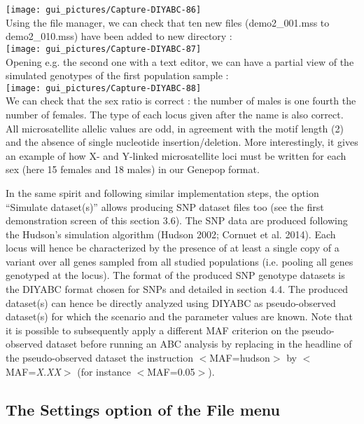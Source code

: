 \texttt{[image: gui\_pictures/Capture-DIYABC-86]} \\


Using the file manager, we can check that ten new files (\textsf{demo2\_001.mss}
to \textsf{demo2\_010.mss}) have been added to new directory :\\


\texttt{[image: gui\_pictures/Capture-DIYABC-87]} \\


Opening e.g. the second one with a text editor, we can have a partial
view of the simulated genotypes of the first population sample : \\


\texttt{[image: gui\_pictures/Capture-DIYABC-88]} \\


We can check that the sex ratio is correct : the number of males is
one fourth the number of females. The type of each locus given after
the name is also correct. All microsatellite allelic values are odd,
in agreement with the motif length (2) and the absence of single nucleotide
insertion/deletion. More interestingly, it gives an example of how
X- and Y-linked microsatellite loci must be written for each sex (here
15 females and 18 males) in our Genepop format.

In the same spirit and following similar implementation steps, the
option ``Simulate dataset(s)'' allows producing SNP dataset files
too (see the first demonstration screen of this section 3.6). The
SNP data are produced following the Hudson\textquoteright{}s simulation
algorithm (Hudson 2002; Cornuet et al. 2014). Each locus will hence
be characterized by the presence of at least a single copy of a variant
over all genes sampled from all studied populations (i.e. pooling
all genes genotyped at the locus). The format of the produced SNP
genotype datasets is the DIYABC format chosen for SNPs and detailed
in section 4.4. The produced dataset(s) can hence be directly analyzed
using DIYABC as pseudo-observed dataset(s) for which the scenario
and the parameter values are known. Note that it is possible to subsequently
apply a different MAF criterion on the pseudo-observed dataset before
running an ABC analysis by replacing in the headline of the pseudo-observed
dataset the instruction \textsf{$<$MAF=hudson$>$} by \textsf{$<$MAF=}\textsf{\textit{X.XX}}\textsf{$>$}
(for instance \textsf{$<$MAF=0.05$>$}).


\subsection{The \textsf{Settings} option of the \textsf{File} menu}

